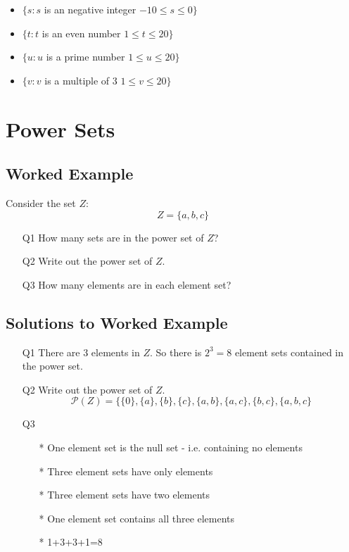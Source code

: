 \documentclass[a4paper,12pt]{article}
\begin{document}
\begin{itemize}
\item $\{ s : s $ is an negative integer $ -10 \leq s \leq 0 \}$
\item $\{ t : t $ is an even number $ 1 \leq t \leq 20 \}$
\item $\{ u : u $ is a prime number $ 1 \leq u \leq 20 \}$
\item $\{ v : v $ is a multiple of 3 $ 1 \leq v \leq 20 \}$
\end{itemize}

\section*{Power Sets}
\subsection*{Worked Example}
Consider the set $Z$:
\[ Z = \{ a,b,c\}  \]
\begin{itemize}
\item[Q1] How many sets are in the power set of $Z$?
\item[Q2] Write out the power set of $Z$.
\item[Q3] How many elements are in each element set?
\end{itemize}
\subsection*{Solutions to Worked Example}

\begin{itemize}


\item[Q1] There are 3 elements in $Z$. So there is $2^3 = 8$ element sets contained in the power set.

\item[Q2] Write out the power set of $Z$.
\[ \mathcal{P}(Z) = \{ \{0\}, \{a\}, \{b\}, \{c\}, \{a,b\}, \{a,c\}, \{b,c\}, \{a,b,c\} \]

\item[Q3]
\begin{itemize}
\item[*] One element set is the null set - i.e. containing no
elements \item[*] Three element sets have only elements \item[*]
Three element sets have two elements \item[*] One element set
contains all three elements \item[*] 1+3+3+1=8
\end{itemize}
\end{itemize}
\end{document}
